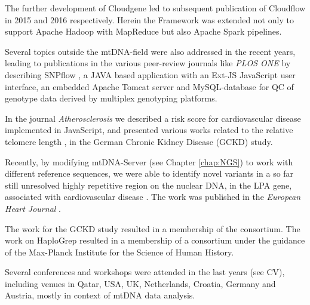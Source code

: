 The further development of Cloudgene led to subsequent publication of Cloudflow in  2015 \cite{Forer2015} and 2016 \cite{Forer2016} respectively. Herein the Framework was extended not only to support Apache Hadoop with MapReduce but also Apache Spark pipelines. 

Several topics outside the mtDNA-field were also addressed in the recent years, leading to publications in the various peer-review journals like \textit{PLOS ONE} by describing SNPflow \cite{Weissensteiner2013}, a JAVA based application with an Ext-JS JavaScript user interface, an embedded Apache Tomcat server and MySQL-database for QC of genotype data derived by multiplex genotyping platforms. 

In the journal \textit{Atherosclerosis} we described a risk score for cardiovascular disease\cite{Lamina2014} implemented in JavaScript, and presented various works related to the relative telomere length \cite{Raschenberger2015assoc,Raschenberger2015dotelomeres}, in the German Chronic Kidney Disease (GCKD) study.

Recently, by modifying mtDNA-Server (see Chapter \ref{chap:NGS}) to work with different reference sequences, we were able to identify novel variants in a so far still unresolved highly repetitive region on the nuclear DNA, in the LPA gene, associated with cardiovascular disease \cite{Kronenberg2014}. The work was published in the \textit{European Heart Journal} \cite{Coassin2017}. 

The work for the GCKD study resulted in a membership of the consortium. The work on HaploGrep resulted in a membership of a consortium under the guidance of the Max-Planck Institute for the Science of Human History.

Several conferences and workshops were attended in the last years (see CV), including venues in Qatar, USA, UK, Netherlands, Croatia, Germany and Austria, mostly in context of mtDNA data analysis. 

